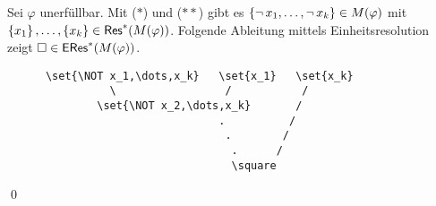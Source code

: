 \begin{description}
\begin{description}
    Sei $\varphi$ unerfüllbar. Mit ($*$) und ($**$) gibt es
    $\left\{\operatorname{\neg} x_1,\dots,\operatorname{\neg} x_k\right\}\in M(\varphi)$ mit
    $\left\{x_1\right\},\dots,\left\{x_k\right\}\in\operatorname{\text{\textsf{Res}}}^*(M(\varphi))$.
    Folgende Ableitung mittels Einheitsresolution zeigt
    $\square\in\operatorname{\text{\textsf{ERes}}}^*(M(\varphi))$.
    \begin{verbatim}
      \set{\NOT x_1,\dots,x_k}   \set{x_1}   \set{x_k}
                \                 /           /
              \set{\NOT x_2,\dots,x_k}       /
                                 .          /
                                  .        /
                                   .      /
                                   \square
    \end{verbatim}
    \qed
  \end{description}
\end{description}
